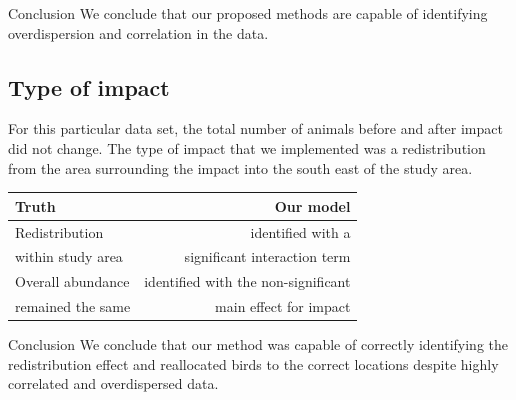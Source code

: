 \begin{block}{Conclusion}
We conclude that our proposed methods are capable of identifying overdispersion and correlation in the data.
\end{block}

\subsection{Type of impact}
For this particular data set, the total number of animals before and after impact did not change. The type of impact that we implemented was a redistribution from the area surrounding the impact into the south east of the study area. 

\begin{table}[ht]
\centering
\begin{tabular}{l|r}
\textbf{Truth} & \textbf{Our model}\\
\hline
Redistribution  & identified with a \\
within study area & significant interaction term\\
\hline
Overall abundance  & identified with the non-significant \\
remained the same & main effect for impact\\
\end{tabular}
\end{table}

\begin{block}{Conclusion}
We conclude that our method was capable of correctly identifying the redistribution effect and reallocated birds to the correct locations despite highly correlated and overdispersed data.\\
\end{block}



%
